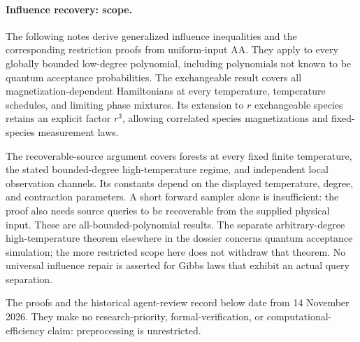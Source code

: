 \paragraph{Influence recovery: scope.}
The following notes derive generalized influence inequalities and the
corresponding restriction proofs from uniform-input AA. They apply to
every globally bounded low-degree polynomial, including polynomials not
known to be quantum acceptance probabilities. The exchangeable result
covers all magnetization-dependent Hamiltonians at every temperature,
temperature schedules, and limiting phase mixtures. Its extension to
\(r\) exchangeable species retains an explicit factor \(r^3\), allowing
correlated species magnetizations and fixed-species measurement laws.

The recoverable-source argument covers forests at every fixed finite
temperature, the stated bounded-degree high-temperature regime, and
independent local observation channels. Its constants depend on the
displayed temperature, degree, and contraction parameters. A short
forward sampler alone is insufficient: the proof also needs source
queries to be recoverable from the supplied physical input. These are
all-bounded-polynomial results. The separate arbitrary-degree
high-temperature theorem elsewhere in the dossier concerns quantum
acceptance simulation; the more restricted scope here does not withdraw
that theorem. No universal influence repair is asserted for Gibbs laws
that exhibit an actual query separation.

The proofs and the historical agent-review record below date from
14 November 2026. They make no research-priority, formal-verification,
or computational-efficiency claim: preprocessing is unrestricted.
